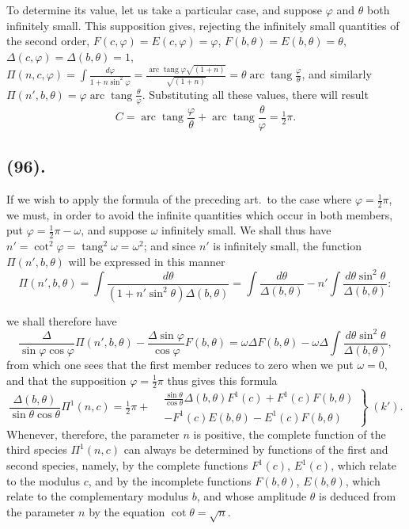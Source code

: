 \documentclass{article}
\begin{document}
To determine its value, let us take a particular case, and suppose $\varphi$ and $\theta$ both infinitely small. This supposition gives, rejecting the infinitely small quantities of the second order, $F(c,\varphi)=E(c,\varphi)=\varphi$, $F(b,\theta)=E(b,\theta)=\theta$, $\Delta(c,\varphi)=\Delta(b,\theta)=1$, $\Pi(n,c,\varphi)=\displaystyle\int\frac{d\varphi}{1+n\sin^{2}\varphi}=\frac{\operatorname{arc}\operatorname{tang}\varphi\sqrt{(1+n)}}{\sqrt{(1+n)}}=\theta\operatorname{arc}\operatorname{tang}\frac{\varphi}{\theta}$, and similarly $\Pi(n',b,\theta)=\varphi\operatorname{arc}\operatorname{tang}\frac{\theta}{\varphi}$. Substituting all these values, there will result
\[ C=\operatorname{arc}\operatorname{tang}\frac{\varphi}{\theta}+\operatorname{arc}\operatorname{tang}\frac{\theta}{\varphi}=\tfrac{1}{2}\pi. \]

\subsection*{(96).}

If we wish to apply the formula of the preceding art.\ to the case where $\varphi=\tfrac{1}{2}\pi$, we must, in order to avoid the infinite quantities which occur in both members, put $\varphi=\tfrac{1}{2}\pi-\omega$, and suppose $\omega$ infinitely small. We shall thus have $n'=\cot^{2}\varphi=\operatorname{tang}^{2}\omega=\omega^{2}$; and since $n'$ is infinitely small, the function $\Pi(n',b,\theta)$ will be expressed in this manner
\[ \Pi(n',b,\theta)=\int\frac{d\theta}{(1+n'\sin^{2}\theta)\Delta(b,\theta)}=\int\frac{d\theta}{\Delta(b,\theta)}-n'\int\frac{d\theta\sin^{2}\theta}{\Delta(b,\theta)}: \]

we shall therefore have
\[ \frac{\Delta}{\sin\varphi\cos\varphi}\Pi(n',b,\theta)-\frac{\Delta\sin\varphi}{\cos\varphi}F(b,\theta)=\omega\Delta F(b,\theta)-\omega\Delta\int\frac{d\theta\sin^{2}\theta}{\Delta(b,\theta)}, \]
from which one sees that the first member reduces to zero when we put $\omega=0$, and that the supposition $\varphi=\tfrac{1}{2}\pi$ thus gives this formula
\[ \frac{\Delta(b,\theta)}{\sin\theta\cos\theta}\Pi^{1}(n,c)=\tfrac{1}{2}\pi+\left.\begin{aligned} &\frac{\sin\theta}{\cos\theta}\Delta(b,\theta)F^{1}(c)+F^{1}(c)F(b,\theta)\\ &-F^{1}(c)E(b,\theta)-E^{1}(c)F(b,\theta) \end{aligned}\right\}\;(k'). \]
Whenever, therefore, the parameter $n$ is positive, the complete function of the third species $\Pi^{1}(n,c)$ can always be determined by functions of the first and second species, namely, by the complete functions $F^{1}(c)$, $E^{1}(c)$, which relate to the modulus $c$, and by the incomplete functions $F(b,\theta)$, $E(b,\theta)$, which relate to the complementary modulus $b$, and whose amplitude $\theta$ is deduced from the parameter $n$ by the equation $\cot\theta=\sqrt{n}$.
\end{document}
